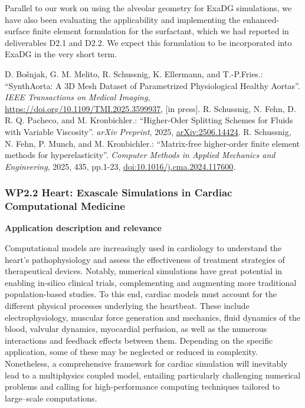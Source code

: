 \documentclass[a4paper,12pt, numbers]{article}
\begin{document}
Parallel to our work on using the alveolar geometry for ExaDG simulations, we have also been evaluating the applicability and implementing the enhanced-surface finite element formulation for the surfactant, which we had reported in deliverables D2.1 and D2.2. We expect this formulation to be incorporated into ExaDG in the very short term.

\begin{thebibliography}{10}
	 D. Bošnjak, G. M. Melito, R. Schussnig, K. Ellermann, and T.-P.Fries.: ``SynthAorta: A 3D Mesh Dataset of Parametrized Physiological Healthy Aortas''. \emph{IEEE Transactions on Medical Imaging},
	\href{https://doi.org/10.1109/TMI.2025.3599937}{https://doi.org/10.1109/TMI.2025.3599937}, [in press].
	 R. Schussnig, N. Fehn, D. R. Q. Pacheco, and M. Kronbichler.: ``Higher-Oder Splitting Schemes for Fluids with Variable Viscosity''. \emph{arXiv Preprint}, 2025, \href{https://doi.org/10.48550/arXiv.2506.14424}{arXiv:2506.14424}.
 R. Schussnig, N. Fehn, P. Munch, and M. Kronbichler.: ``Matrix-free higher-order finite element methods for hyperelasticity''. \emph{Computer Methods in Applied Mechanics and Engineering}, 2025, 435,
pp.1-23, \href{https://doi.org/10.1016/j.cma.2024.117600}{doi:10.1016/j.cma.2024.117600}.
\end{thebibliography}

\subsubsection*{WP2.2 Heart: Exascale Simulations in Cardiac Computational Medicine}

\noindent\textbf{Application description and relevance}

Computational models are increasingly used in cardiology to understand the heart's pathophysiology and assess the effectiveness of treatment strategies of therapeutical devices.
Notably, numerical simulations have great potential in enabling in-silico clinical trials, complementing and augmenting more traditional population-based studies.
To this end, cardiac models must account for the different physical processes underlying the heartbeat.
These include electrophysiology, muscular force generation and mechanics, fluid dynamics of the blood, valvular dynamics, myocardial perfusion, as well as the numerous interactions and feedback effects between them.
Depending on the specific application, some of these may be neglected or reduced in complexity.
Nonetheless, a comprehensive framework for cardiac simulation will inevitably lead to a multiphysics coupled model, entailing particularly challenging numerical problems and calling for high-performance computing techniques tailored to large--scale computations.
\end{document}
